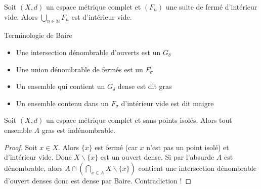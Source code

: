 \begin{corollaire}
    Soit $(X,d)$ un espace métrique complet et $(F_n)$ une suite de fermé d'intérieur vide. Alors $\bigcup\limits_{n\in \mathbb{N} } F_n$ est d'intérieur vide.
\end{corollaire}

Terminologie de Baire
\begin{itemize}
    \item Une intersection dénombrable d'ouverts est un $G_{\delta}$
    \item Une union dénombrable de fermés est un $F_\sigma$
    \item Un ensemble qui contient un $G_{\delta}$ dense est dit gras
    \item Un ensemble contenu dans un $F_\sigma$ d'intérieur vide est dit maigre
\end{itemize}

\begin{remarque}
    Soit $(X,d)$ un espace métrique complet et sans points isolés. Alors tout ensemble $A$ gras est indénombrable.
\end{remarque}
\begin{proof}
    Soit $x\in X$. Alors $\{x\} $ est fermé (car $x$ n'est pas un point isolé) et d'intérieur vide. Donc $X\backslash \{x\} $ est un ouvert dense. Si par l'absurde $A$ est dénombrable, alors $A\cap \left( \bigcap\limits_{x\in A} X\backslash \{x\}  \right) $ contient une intersection dénombrable d'ouvert denses donc est dense par Baire. Contradiction !
\end{proof}

